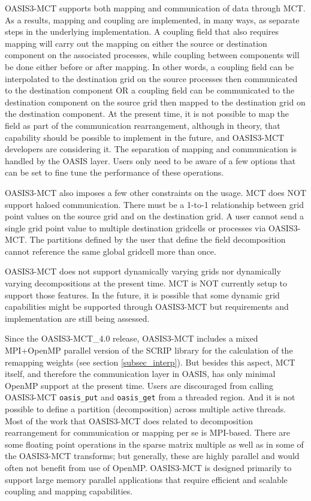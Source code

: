 OASIS3-MCT supports both mapping and communication of data through MCT.  As
a results, mapping and coupling are implemented, in many ways, as separate
steps in the underlying implementation.  A coupling field that also requires
mapping will carry out the mapping on either the source or destination component
on the associated processes, while coupling between components will be done
either before or after mapping.  In other words, a coupling field can be 
interpolated to
the destination grid on the source processes then communicated to the destination
component OR a coupling field can be communicated to the destination component
on the source grid then mapped to the destination grid on the destination 
component.  At the present time, it is not possible to map the field as part
of the communication rearrangement, although in theory, that capability should
be possible to implement in the future, and OASIS3-MCT developers are considering
it.  The separation of mapping and communication is handled by the OASIS
layer.  Users only need to be aware of a few options that can be set to fine
tune the performance of these operations.

OASIS3-MCT also imposes a few other constraints on the usage.  MCT
does NOT support haloed communication.  There must be a 1-to-1 relationship
between grid point values on the source grid and on the destination grid.
A user cannot send a single grid point value to multiple destination gridcells
or processes via OASIS3-MCT.  The partitions defined by the user that define
the field decomposition cannot reference the same global gridcell more than once.

OASIS3-MCT does not support dynamically varying grids nor dynamically varying 
decompositions at the present time.  MCT is NOT currently setup to support those 
features.  In the future, it is possible that some dynamic grid capabilities 
might be supported through OASIS3-MCT but requirements and implementation are
still being assessed.

Since the OASIS3-MCT\_4.0 release, OASIS3-MCT includes a mixed MPI+OpenMP parallel version of the SCRIP library for the calculation of the remapping weights (see section \ref{subsec_interp}). But besides this aspect, MCT itself, and therefore the communication layer in OASIS, has only minimal OpenMP support at the
present time.  Users are discouraged from calling OASIS3-MCT {\tt oasis\_put} and {\tt oasis\_get}
from a threaded region.  And it is not possible to define a partition (decomposition)
across multiple active threads.  Most of the work that OASIS3-MCT does related to decomposition rearrangement for communication or mapping per se is MPI-based.  There
are some floating point operations in the sparse matrix multiple as well as in
some of the OASIS3-MCT transforms; but generally, these are highly parallel and
would often not benefit from use of OpenMP.  OASIS3-MCT is designed primarily to
support large memory parallel applications that require efficient and scalable
coupling and mapping capabilities.

